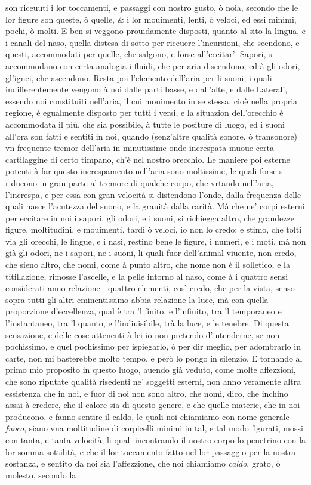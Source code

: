 \documentclass[11pt,twoside,openany]{book}
\begin{document}
son riceuuti i lor toccamenti, e passaggi con nostro gusto, ò noia, secondo che le lor figure son queste, ò quelle, \& i lor mouimenti, lenti, ò veloci, ed essi minimi, pochi, ò molti. E ben si veggono prouidamente disposti, quanto al sito la lingua, e i canali del naso, quella distesa di sotto per riceuere l'incursioni, che scendono, e questi, accommodati per quelle, che salgono, e forse all'eccitar'i Sapori, si accommodano con certa analogia i fluidi, che per aria discendono, ed à gli odori, gl'ignei, che ascendono. Resta poi l'elemento dell'aria per li suoni, i quali indifferentemente vengono à noi dalle parti basse, e dall'alte, e dalle Laterali, essendo noi constituiti nell'aria, il cui mouimento in se stessa, cioè nella propria regione, è egualmente disposto per tutti i versi, e la situazion dell'orecchio è accommodata il più, che sia possibile, à tutte le positure di luogo, ed i suoni all'ora son fatti e sentiti in noi, quando (senz'altre qualità sonore, ò transonore) vn frequente tremor dell'aria in minutissime onde increspata muoue certa cartilaggine di certo timpano, ch'è nel nostro orecchio. Le maniere poi esterne potenti à far questo increspamento nell'aria sono moltissime, le quali forse si riducono in gran parte al tremore di qualche corpo, che vrtando nell'aria, l'increspa, e per essa con gran velocità si distendono l'onde, dalla frequenza delle quali nasce l'acutezza del suono, e la grauità dalla rarità. Mà che ne' corpi esterni per eccitare in noi i sapori, gli odori, e i suoni, si richiegga altro, che grandezze figure, moltitudini, e mouimenti, tardi ò veloci, io non lo credo; e stimo, che tolti via gli orecchi, le lingue, e i nasi, restino bene le figure, i numeri, e i moti, mà non già gli odori, ne i sapori, ne i suoni, li quali fuor dell'animal viuente, non credo, che sieno altro, che nomi, come à punto altro, che nome non è il solletico, e la titillazione, rimosse l'ascelle, e la pelle intorno al naso, come à i quattro sensi considerati anno relazione i quattro elementi, così credo, che per la vista, senso sopra tutti gli altri eminentissimo abbia relazione la luce, mà con quella proporzione d'eccellenza, qual è tra 'l finito, e l'infinito, tra 'l temporaneo e l'instantaneo, tra 'l quanto, e l'indiuisibile, trà la luce, e le tenebre. Di questa sensazione, e delle cose attenenti à lei io non pretendo d'intenderne, se non pochissimo, e quel pochissimo per ispiegarlo, ò per dir meglio, per adombrarlo in carte, non mi basterebbe molto tempo, e però lo pongo in silenzio. E tornando al primo mio proposito in questo luogo, auendo già veduto, come molte affezzioni, che sono riputate qualità risedenti ne' soggetti esterni, non anno veramente altra essistenza che in noi, e fuor di noi non sono altro, che nomi, dico, che inchino assai à credere, che il calore sia di questo genere, e che quelle materie, che in noi producono, e fanno sentire il caldo, le quali noi chiamiamo con nome generale \textit{fuoco}, siano vna moltitudine di corpicelli minimi in tal, e tal modo figurati, mossi con tanta, e tanta velocità; li quali incontrando il nostro corpo lo penetrino con la lor somma sottilità, e che il lor toccamento fatto nel lor passaggio per la nostra sostanza, e sentito da noi sia l'affezzione, che noi chiamiamo \textit{caldo}, grato, ò molesto, secondo la 
\end{document}
